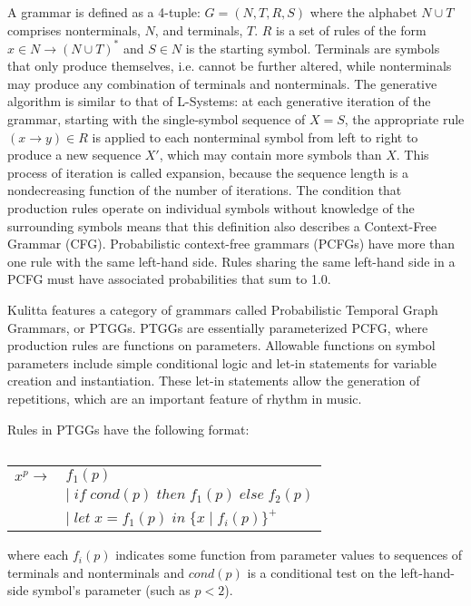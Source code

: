\documentclass{article}
\begin{document}
A grammar is defined as a 4-tuple: $G= (N,T,R,S)$ where the alphabet $N\cup T$ comprises nonterminals, $N$, and terminals, $T$. $R$ is a set of rules of the form $x \in N \rightarrow (N \cup T)^{*}$ and $S \in N$ is the starting symbol. Terminals are symbols that only produce themselves, i.e. cannot be further altered, while nonterminals may produce any combination of terminals and nonterminals. The generative algorithm is similar to that of L-Systems: at each generative iteration of the grammar, starting with the single-symbol sequence of $X = S$, the appropriate rule $(x \rightarrow y) \in R$ is applied to each nonterminal symbol from left to right to produce a new sequence $X'$, which may contain more symbols than $X$. This process of iteration is called expansion, because the sequence length is a nondecreasing function of the number of iterations. The condition that production rules operate on individual symbols without knowledge of the surrounding symbols means that this definition also describes a Context-Free Grammar (CFG). Probabilistic context-free grammars (PCFGs) have more than one rule with the same left-hand side. Rules sharing the same left-hand side in a PCFG must have associated probabilities that sum to 1.0.

Kulitta features a category of grammars called Probabilistic Temporal Graph Grammars\cite{quick2013farm, quick_thesis}, or PTGGs. PTGGs are essentially parameterized PCFG, where production rules are functions on parameters. Allowable functions on symbol parameters include simple conditional logic and let-in statements for variable creation and instantiation. These let-in statements allow the generation of repetitions, which are an important feature of rhythm in music.


Rules in PTGGs have the following format:

$\;$ \\
\begin{tabular}{ll}
$x^p \rightarrow$ & $f_{1}(p)$ \\
$\;$ & $ \vert \;  if \; cond(p) \; then \; f_{1}(p) \; else \; f_{2}(p)$ \\
$\;$ & $\vert \; let \; x = f_{1}(p) \; in \; \{x \; | \; f_{i}(p)\}^{+}$ \\
\end{tabular} $\;$ \\

\noindent where each $f_{i}(p)$ indicates some function from parameter values to sequences of terminals and nonterminals and $cond(p)$ is a conditional test on the left-hand-side symbol's parameter (such as $p<2$).
\end{document}
